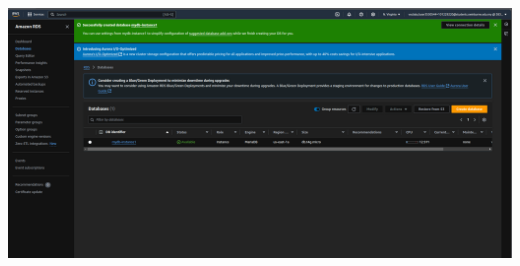 \documentclass[11pt]{article}
\begin{document}
\begin{enumerate}[resume]
    {\centering
    \includegraphics[width=5.8in]{pics/31.png}
    }


\end{enumerate}
\end{document}
